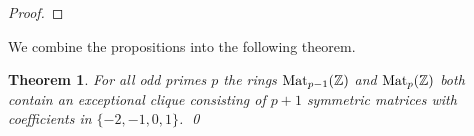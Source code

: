 \documentclass{amsart}
\theoremstyle{plain}
\newtheorem{theorem}{Theorem}[section]
\theoremstyle{definition}
\newcommand{\Z}{\ensuremath{\mathbb{Z}}}
\newcommand{\F}{\ensuremath{\mathbb{F}}}
\begin{document}
\begin{proof}

\end{proof}

We combine the propositions into the following theorem.

\begin{theorem}\label{thm:graphs}
	For all odd primes \(p\) the rings \(\textup{Mat}_{p-1}(\Z)\) and \(\textup{Mat}_p(\Z)\) both contain an exceptional clique consisting of \(p+1\) symmetric matrices with coefficients in \(\{-2,-1,0,1\}\). \qed
\end{theorem}
\end{document}
